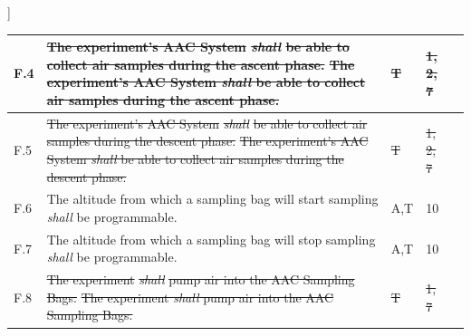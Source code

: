 ]\documentclass[a4paper,12pt,twoside]{article}
\providecommand{\DIFaddtex}[1]{{\protect\color{blue}\uwave{#1}}} %
\providecommand{\DIFdeltex}[1]{{\protect\color{red}\sout{#1}}}                      %
\providecommand{\DIFaddbegin}{} %
\providecommand{\DIFaddend}{} %
\providecommand{\DIFdelbegin}{} %
\providecommand{\DIFdelend}{} %
\providecommand{\DIFadd}[1]{\texorpdfstring{\DIFaddtex{#1}}{#1}} %
\providecommand{\DIFdel}[1]{\texorpdfstring{\DIFdeltex{#1}}{}} %
\newcommand{\DIFscaledelfig}{0.5}
\newlength{\DIFdelgraphicswidth} %
\newlength{\DIFdelgraphicsheight} %
\newcommand{\DIFaddincludegraphics}[2][]{{\color{blue}\fbox{\DIFOincludegraphics[#1]{#2}}}} %
\newcommand{\DIFdelincludegraphics}[2][]{%
\sbox{\DIFdelgraphicsbox}{\DIFOincludegraphics[#1]{#2}}%
\settoboxwidth{\DIFdelgraphicswidth}{\DIFdelgraphicsbox} %
\settoboxtotalheight{\DIFdelgraphicsheight}{\DIFdelgraphicsbox} %
\scalebox{\DIFscaledelfig}{%
\parbox[b]{\DIFdelgraphicswidth}{\usebox{\DIFdelgraphicsbox}\\[-\baselineskip] \rule{\DIFdelgraphicswidth}{0em}}\llap{\resizebox{\DIFdelgraphicswidth}{\DIFdelgraphicsheight}{%
\setlength{\unitlength}{\DIFdelgraphicswidth}%
\begin{picture}(1,1)%
\thicklines\linethickness{2pt} %
{\color[rgb]{1,0,0}\put(0,0){\framebox(1,1){}}}%
{\color[rgb]{1,0,0}\put(0,0){\line( 1,1){1}}}%
{\color[rgb]{1,0,0}\put(0,1){\line(1,-1){1}}}%
\end{picture}%
}\hspace*{3pt}}} %
} %
\DeclareRobustCommand{\DIFaddbegin}{\DIFOaddbegin \let\includegraphics\DIFaddincludegraphics} %
\DeclareRobustCommand{\DIFaddend}{\DIFOaddend \let\includegraphics\DIFOincludegraphics} %
\DeclareRobustCommand{\DIFdelbegin}{\DIFOdelbegin \let\includegraphics\DIFdelincludegraphics} %
\DeclareRobustCommand{\DIFdelend}{\DIFOaddend \let\includegraphics\DIFOincludegraphics} %
\begin{document}
\begin{longtable}[]{|m{}| m{} |m{} |m{}|m{}|}
F.4  & \DIFdelbegin \DIFdel{The experiment's AAC System }\textit{\DIFdel{shall}} %
\DIFdel{be able to collect air samples during the ascent phase.                                                                               }\DIFdelend \DIFaddbegin \st{The experiment's AAC System \textit{shall} be able to collect air samples during the ascent phase.}\DIFadd{\textsuperscript{\ref{fn:unnecessary-requirement}}                                                                               }\DIFaddend &     \DIFdelbegin \DIFdel{T         }\DIFdelend \DIFaddbegin \DIFadd{-        }\DIFaddend & \DIFdelbegin \DIFdel{1, 2, 7     }\DIFdelend \DIFaddbegin \DIFadd{-     }\DIFaddend &        \\ \hline
F.5  & \DIFdelbegin \DIFdel{The experiment's AAC System }\textit{\DIFdel{shall}} %
\DIFdel{be able to collect air samples during the descent phase.                                                                              }\DIFdelend \DIFaddbegin \st{The experiment's AAC System \textit{shall} be able to collect air samples during the descent phase.}\DIFadd{\textsuperscript{\ref{fn:unnecessary-requirement}}                                                                               }\DIFaddend &      \DIFdelbegin \DIFdel{T        }\DIFdelend \DIFaddbegin \DIFadd{- }\DIFaddend & \DIFdelbegin \DIFdel{1, 2, 7    }\DIFdelend \DIFaddbegin \DIFadd{-    }\DIFaddend &        \\ \hline
F.6  & The altitude from which a sampling bag will start sampling \textit{shall} be programmable.                                                                                       &     A,T         &  10           &        \\ \hline
F.7  & The altitude from which a sampling bag will stop sampling \textit{shall} be programmable.                                                                                        &    A,T          & 10            &        \\ \hline
F.8  &\DIFdelbegin \DIFdel{The experiment }\textit{\DIFdel{shall}} %
\DIFdel{pump air into the AAC Sampling Bags.                                                                                                               }\DIFdelend \DIFaddbegin \st{The experiment \textit{shall} pump air into the AAC Sampling Bags.}\DIFadd{\textsuperscript{\ref{fn:unnecessary-requirement}}                                                                                                                }\DIFaddend &     \DIFdelbegin \DIFdel{T        }\DIFdelend \DIFaddbegin \DIFadd{-       }\DIFaddend & \DIFdelbegin \DIFdel{1, 7            }\DIFdelend \DIFaddbegin \DIFadd{-            }\DIFaddend &        \\ \hline

\end{longtable}
\end{document}
